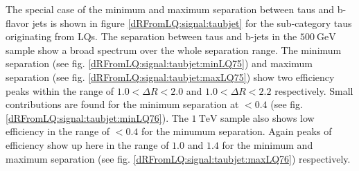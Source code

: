 %
%
%
The special case of the minimum and maximum separation between taus and b-flavor jets is shown in figure \ref{dRFromLQ:signal:taubjet} for the sub-category taus originating from LQs. The separation between taus and b-jets in the $\SI{500}{\giga\electronvolt}$ sample show a broad spectrum over the whole separation range. The minimum separation (see fig. \ref{dRFromLQ:signal:taubjet:minLQ75}) and maximum separation (see fig. \ref{dRFromLQ:signal:taubjet:maxLQ75}) show two efficiency peaks within the range of $1.0<\Delta R<2.0$ and $1.0<\Delta R<2.2$ respectively. Small contributions are found for the minimum separation at $<0.4$ (see fig. \ref{dRFromLQ:signal:taubjet:minLQ76}). The $\SI{1}{\tera\electronvolt}$ sample also shows low efficiency in the range of $<0.4$ for the minumum separation. Again peaks of efficiency show up here in the range of $1.0$ and $1.4$ for the minimum and maximum separation (see fig. \ref{dRFromLQ:signal:taubjet:maxLQ76}) respectively.
%
